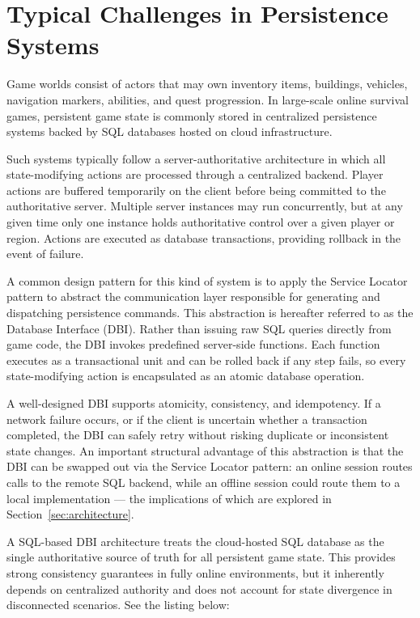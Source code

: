 \documentclass{article}
\begin{document}
\newpage

\section{Typical Challenges in Persistence Systems}
\label{sec:challenges}

Game worlds consist of actors that may own inventory items, buildings, vehicles, navigation markers, abilities, and quest progression. In large-scale online survival games, persistent game state is commonly stored in centralized persistence systems backed by SQL databases hosted on cloud infrastructure.

Such systems typically follow a server-authoritative architecture in which all state-modifying actions are processed through a centralized backend. Player actions are buffered temporarily on the client before being committed to the authoritative server. Multiple server instances may run concurrently, but at any given time only one instance holds authoritative control over a given player or region. Actions are executed as database transactions, providing rollback in the event of failure.

A common design pattern for this kind of system is to apply the Service Locator pattern \autocite{nystrom2014servicelocator} to abstract the communication layer responsible for generating and dispatching persistence commands. This abstraction is hereafter referred to as the Database Interface (DBI). Rather than issuing raw SQL queries directly from game code, the DBI invokes predefined server-side functions. Each function executes as a transactional unit and can be rolled back if any step fails, so every state-modifying action is encapsulated as an atomic database operation.

A well-designed DBI supports atomicity, consistency, and \gls{idempotency}. If a network failure occurs, or if the client is uncertain whether a transaction completed, the DBI can safely retry without risking duplicate or inconsistent state changes. An important structural advantage of this abstraction is that the DBI can be swapped out via the Service Locator pattern: an online session routes calls to the remote SQL backend, while an offline session could route them to a local implementation — the implications of which are explored in Section~\ref{sec:architecture}.

A SQL-based DBI architecture treats the cloud-hosted SQL database as the single authoritative source of truth for all persistent game state. This provides strong consistency guarantees in fully online environments, but it inherently depends on centralized authority and does not account for state divergence in disconnected scenarios. See the listing below:
\end{document}
